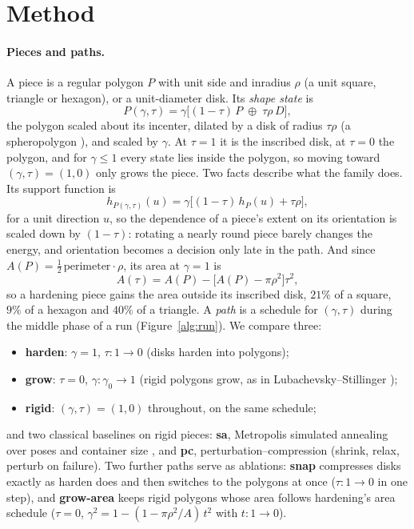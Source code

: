 \section{Method}\label{sec:method}
\paragraph{Pieces and paths.} A piece is a regular polygon $P$ with unit side and inradius $\rho$ (a unit square, triangle or hexagon), or a unit-diameter disk. Its \emph{shape state} is
\[
P(\gamma,\tau)=\gamma\big[(1-\tau)\,P\;\oplus\;\tau\rho\,D\big],
\]
the polygon scaled about its incenter, dilated by a disk of radius $\tau\rho$ (a spheropolygon \citep{AlonsoMarroquin2008}), and scaled by $\gamma$. At $\tau=1$ it is the inscribed disk, at $\tau=0$ the polygon, and for $\gamma\le1$ every state lies inside the polygon, so moving toward $(\gamma,\tau)=(1,0)$ only grows the piece. Two facts describe what the family does. Its support function is
\[
h_{P(\gamma,\tau)}(u)=\gamma\big[(1-\tau)\,h_P(u)+\tau\rho\big],
\]
for a unit direction $u$, so the dependence of a piece's extent on its orientation is scaled down by $(1-\tau)$: rotating a nearly round piece barely changes the energy, and orientation becomes a decision only late in the path. And since $A(P)=\tfrac12\,\mathrm{perimeter}\cdot\rho$, its area at $\gamma=1$ is
\[
A(\tau)=A(P)-\big[A(P)-\pi\rho^2\big]\tau^2 ,
\]
so a hardening piece gains the area outside its inscribed disk, $21\%$ of a square, $9\%$ of a hexagon and $40\%$ of a triangle. A \emph{path} is a schedule for $(\gamma,\tau)$ during the middle phase of a run (Figure~\ref{alg:run}). We compare three:
\begin{itemize}\itemsep0pt
\item \textbf{harden}: $\gamma=1$, $\tau:1\to0$ (disks harden into polygons);
\item \textbf{grow}: $\tau=0$, $\gamma:\gamma_0\to1$ (rigid polygons grow, as in Lubachevsky--Stillinger \citep{lubachevsky});
\item \textbf{rigid}: $(\gamma,\tau)=(1,0)$ throughout, on the same schedule;
\end{itemize}
and two classical baselines on rigid pieces: \textbf{sa}, Metropolis simulated annealing over poses and container size \citep{kirkpatrick}, and \textbf{pc}, perturbation--compression \citep{Gensane2004,gensane} (shrink, relax, perturb on failure). Two further paths serve as ablations: \textbf{snap} compresses disks exactly as harden does and then switches to the polygons at once ($\tau:1\to0$ in one step), and \textbf{grow-area} keeps rigid polygons whose area follows hardening's area schedule ($\tau=0$, $\gamma^2=1-(1-\pi\rho^2/A)\,t^2$ with $t:1\to0$).

